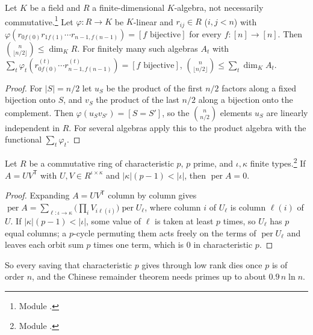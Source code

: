 \documentclass[10pt]{amsart}
\theoremstyle{plain}
\theoremstyle{definition}
\theoremstyle{remark}
\numberwithin{equation}{section}
\newcommand{\per}{\operatorname{per}}
\begin{document}
\begin{theorem}\label{thm:algebra}
Let $K$ be a field and $R$ a finite-dimensional $K$-algebra, not necessarily
commutative.\footnote{Module .} Let
$\varphi:R\to K$ be $K$-linear and $r_{ij}\in R$ ($i,j<n$) with
$\varphi(r_{0f(0)}r_{1f(1)}\cdots r_{n-1,f(n-1)})=[f\text{ bijective}]$ for every $f:[n]\to[n]$. Then
$\binom n{\lfloor n/2\rfloor}\le\dim_KR$. For finitely many such algebras $A_t$ with
$\sum_t\varphi_t(r^{(t)}_{0f(0)}\cdots r^{(t)}_{n-1,f(n-1)})=[f\text{ bijective}]$,
$\binom n{\lfloor n/2\rfloor}\le\sum_t\dim_KA_t$.
\end{theorem}
\begin{proof}
For $|S|=n/2$ let $u_S$ be the product of the first $n/2$ factors along a fixed bijection onto $S$, and
$v_S$ the product of the last $n/2$ along a bijection onto the complement. Then
$\varphi(u_Sv_{S'})=[S=S']$, so the $\binom n{n/2}$ elements $u_S$ are linearly independent in $R$. For
several algebras apply this to the product algebra with the functional $\sum_t\varphi_t$.
\end{proof}

\begin{theorem}\label{thm:modp}
Let $R$ be a commutative ring of characteristic $p$, $p$ prime, and $\iota,\kappa$ finite
types.\footnote{Module .} If $A=UV^{\mathsf T}$ with
$U,V\in R^{\iota\times\kappa}$ and $|\kappa|(p-1)<|\iota|$, then $\per A=0$.
\end{theorem}
\begin{proof}
Expanding $A=UV^{\mathsf T}$ column by column gives $\per A=\sum_{\ell:\iota\to\kappa}\bigl(\prod_iV_{i\ell(i)}\bigr)\per U_\ell$,
where column $i$ of $U_\ell$ is column $\ell(i)$ of $U$. If $|\kappa|(p-1)<|\iota|$, some value of $\ell$ is
taken at least $p$ times, so $U_\ell$ has $p$ equal columns; a $p$-cycle permuting them acts freely on the
terms of $\per U_\ell$ and leaves each orbit sum $p$ times one term, which is $0$ in characteristic $p$.
\end{proof}

\noindent So every saving that characteristic $p$ gives through low rank dies once $p$ is of order $n$,
and the Chinese remainder theorem needs primes up to about $0.9\,n\ln n$.
\end{document}

